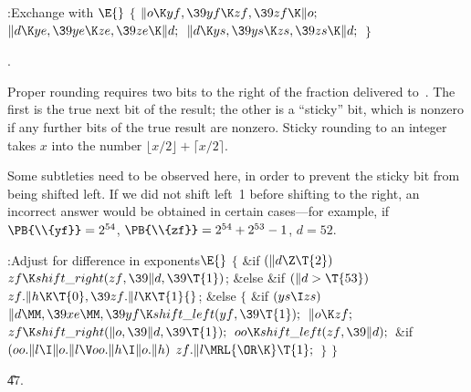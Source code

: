 \B{}:Exchange  with \X${}\E{}$\6
${}\{{}$\1\6
${}\|o\K\\{yf},\39\\{yf}\K\\{zf},\39\\{zf}\K\|o;{}$\6
${}\|d\K\\{ye},\39\\{ye}\K\\{ze},\39\\{ze}\K\|d;{}$\6
${}\|d\K\\{ys},\39\\{ys}\K\\{zs},\39\\{zs}\K\|d;{}$\6
\4${}\}{}$\2\par
{}.\fi

Proper rounding requires two bits to the right of the fraction delivered
to~. The first is the true next bit of the result;
the other is a ``sticky'' bit, which is nonzero if any further bits of the
true result are nonzero. Sticky rounding to an integer takes
$x$ into the number $\lfloor x/2\rfloor+\lceil x/2\rceil$.

Some subtleties need to be observed here, in order to
prevent the sticky bit from being shifted left. If we did not
shift  left~1 before shifting  to the right, an incorrect
answer would be obtained in certain cases---for example, if
$\PB{\\{yf}}=2^{54}$, $\PB{\\{zf}}=2^{54}+2^{53}-1$, $d=52$.

\Y\B\4:Adjust for difference in exponents\X${}\E{}$\6
${}\{{}$\1\6
\&{if} ${}(\|d\Z\T{2}){}$\1\5
${}\\{zf}\K\\{shift\_right}(\\{zf},\39\|d,\39\T{1}){}$;\2\6
\&{else} \&{if} ${}(\|d>\T{53}){}$\1\5
${}\\{zf}.\|h\K\T{0},\39\\{zf}.\|l\K\T{1}{}$;\2\6
\&{else}\5
${}\{{}$\1\6
\&{if} ${}(\\{ys}\I\\{zs}){}$\1\5
${}\|d\MM,\39\\{xe}\MM,\39\\{yf}\K\\{shift\_left}(\\{yf},\39\T{1});{}$\2\6
${}\|o\K\\{zf};{}$\6
${}\\{zf}\K\\{shift\_right}(\|o,\39\|d,\39\T{1});{}$\6
${}\\{oo}\K\\{shift\_left}(\\{zf},\39\|d);{}$\6
\&{if} ${}(\\{oo}.\|l\I\|o.\|l\V\\{oo}.\|h\I\|o.\|h){}$\1\5
${}\\{zf}.\|l\MRL{{\OR}{\K}}\T{1};{}$\2\6
\4${}\}{}$\2\6
\4${}\}{}$\2\par
\U47.\fi

